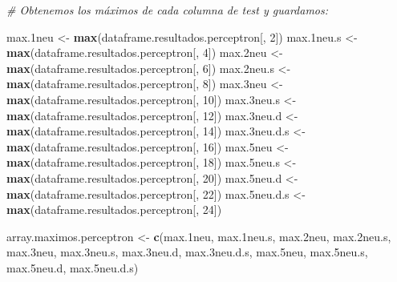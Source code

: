 \documentclass[]{article}
\newenvironment{Shaded}{\begin{snugshade}}{\end{snugshade}}
\newcommand{\KeywordTok}[1]{\textcolor[rgb]{0.13,0.29,0.53}{\textbf{#1}}}
\newcommand{\DecValTok}[1]{\textcolor[rgb]{0.00,0.00,0.81}{#1}}
\newcommand{\StringTok}[1]{\textcolor[rgb]{0.31,0.60,0.02}{#1}}
\newcommand{\CommentTok}[1]{\textcolor[rgb]{0.56,0.35,0.01}{\textit{#1}}}
\newcommand{\NormalTok}[1]{#1}
\begin{document}
\begin{Shaded}
\begin{Highlighting}[]
\CommentTok{# Obtenemos los máximos de cada columna de test y guardamos:}

\NormalTok{max.1neu <-}\StringTok{ }\KeywordTok{max}\NormalTok{(dataframe.resultados.perceptron[, }\DecValTok{2}\NormalTok{])}
\NormalTok{max.1neu.s <-}\StringTok{ }\KeywordTok{max}\NormalTok{(dataframe.resultados.perceptron[, }\DecValTok{4}\NormalTok{])}
\NormalTok{max.2neu <-}\StringTok{ }\KeywordTok{max}\NormalTok{(dataframe.resultados.perceptron[, }\DecValTok{6}\NormalTok{])}
\NormalTok{max.2neu.s <-}\StringTok{ }\KeywordTok{max}\NormalTok{(dataframe.resultados.perceptron[, }\DecValTok{8}\NormalTok{])}
\NormalTok{max.3neu <-}\StringTok{ }\KeywordTok{max}\NormalTok{(dataframe.resultados.perceptron[, }\DecValTok{10}\NormalTok{])}
\NormalTok{max.3neu.s <-}\StringTok{ }\KeywordTok{max}\NormalTok{(dataframe.resultados.perceptron[, }\DecValTok{12}\NormalTok{])}
\NormalTok{max.3neu.d <-}\StringTok{ }\KeywordTok{max}\NormalTok{(dataframe.resultados.perceptron[, }\DecValTok{14}\NormalTok{])}
\NormalTok{max.3neu.d.s <-}\StringTok{ }\KeywordTok{max}\NormalTok{(dataframe.resultados.perceptron[, }\DecValTok{16}\NormalTok{])}
\NormalTok{max.5neu <-}\StringTok{ }\KeywordTok{max}\NormalTok{(dataframe.resultados.perceptron[, }\DecValTok{18}\NormalTok{])}
\NormalTok{max.5neu.s <-}\StringTok{ }\KeywordTok{max}\NormalTok{(dataframe.resultados.perceptron[, }\DecValTok{20}\NormalTok{])}
\NormalTok{max.5neu.d <-}\StringTok{ }\KeywordTok{max}\NormalTok{(dataframe.resultados.perceptron[, }\DecValTok{22}\NormalTok{])}
\NormalTok{max.5neu.d.s <-}\StringTok{ }\KeywordTok{max}\NormalTok{(dataframe.resultados.perceptron[, }\DecValTok{24}\NormalTok{])}

\NormalTok{array.maximos.perceptron <-}\StringTok{ }\KeywordTok{c}\NormalTok{(max.1neu, }
\NormalTok{                              max.1neu.s, }
\NormalTok{                              max.2neu,}
\NormalTok{                              max.2neu.s,}
\NormalTok{                              max.3neu,}
\NormalTok{                              max.3neu.s,}
\NormalTok{                              max.3neu.d, }
\NormalTok{                              max.3neu.d.s, }
\NormalTok{                              max.5neu, }
\NormalTok{                              max.5neu.s, }
\NormalTok{                              max.5neu.d, }
\NormalTok{                              max.5neu.d.s)}


\end{Highlighting}
\end{Shaded}
\end{document}
